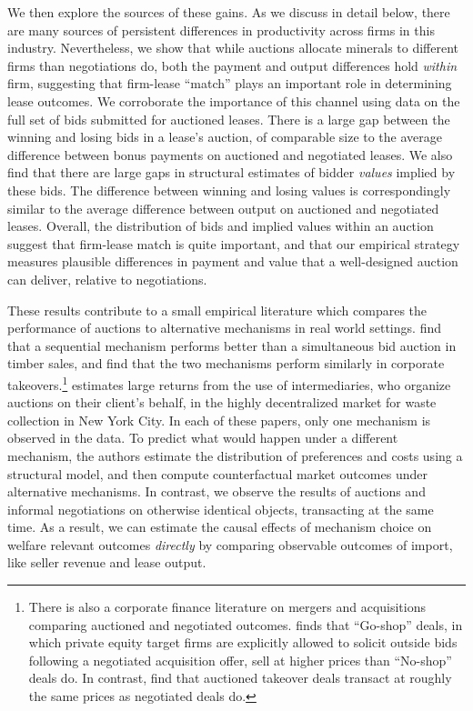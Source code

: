 \documentclass[12pt]{article}
\begin{document}
We then explore the sources of these gains. As we discuss in detail below, there are many sources of persistent differences in productivity across firms in this industry. Nevertheless, we show that while auctions allocate minerals to different firms than negotiations do, both the payment and output differences hold \textit{within} firm, suggesting that firm-lease ``match'' plays an important role in determining lease outcomes. We corroborate the importance of this channel using data on the full set of bids submitted for auctioned leases. There is a large gap between the winning and losing bids in a lease's auction, of comparable size to the average difference between bonus payments on auctioned and negotiated leases.  We also find that there are large gaps in structural estimates of bidder \textit{values} implied by these bids.  The difference between winning and losing values is correspondingly similar to the average difference between output on auctioned and negotiated leases.  Overall, the distribution of bids and implied values within an auction suggest that firm-lease match is quite important, and that our empirical strategy measures plausible differences in payment and value that a well-designed auction can deliver, relative to negotiations.  

These results contribute to a small empirical literature which compares the performance of auctions to alternative mechanisms in real world settings. \cite{roberts_when_2013} find that a sequential mechanism performs better than a simultaneous bid auction in timber sales, and \cite{gentry2018entry} find that the two mechanisms perform similarly in corporate takeovers.\footnote{There is also a corporate finance literature on mergers and acquisitions comparing auctioned and negotiated outcomes. \cite{subramanian_go-shops_2007} finds that ``Go-shop'' deals, in which private equity target firms are explicitly allowed to solicit outside bids following a negotiated acquisition offer, sell at higher prices than ``No-shop'' deals do. In contrast, \cite{boone_how_2007} find that auctioned takeover deals transact at roughly the same prices as negotiated deals do.} \cite{salz_intermediation_2017} estimates large returns from the use of intermediaries, who organize auctions on their client's behalf, in the highly decentralized market for waste collection in New York City. In each of these papers, only one mechanism is observed in the data.  To predict what would happen under a different mechanism, the authors estimate the distribution of preferences and costs using a structural model, and then compute counterfactual market outcomes under alternative mechanisms.  In contrast, we observe the results of auctions and informal negotiations on otherwise identical objects, transacting at the same time.  As a result, we can estimate the causal effects of mechanism choice on welfare relevant outcomes \emph{directly} by comparing observable outcomes of import, like seller revenue and lease output. 
\end{document}
